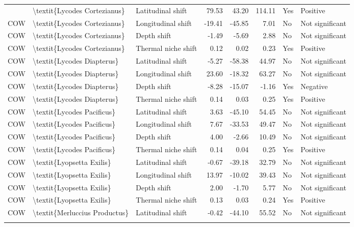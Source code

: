\begin{longtable}[t]{lllrrrll}
{{COW & \textbackslash{}textit\{Lycodes Cortezianus\} & Latitudinal shift & 79.53 & 43.20 & 114.11 & Yes & Positive\\
COW & \textbackslash{}textit\{Lycodes Cortezianus\} & Longitudinal shift & -19.41 & -45.85 & 7.01 & No & Not significant\\
\addlinespace
COW & \textbackslash{}textit\{Lycodes Cortezianus\} & Depth shift & -1.49 & -5.69 & 2.88 & No & Not significant\\
COW & \textbackslash{}textit\{Lycodes Cortezianus\} & Thermal niche shift & 0.12 & 0.02 & 0.23 & Yes & Positive\\
COW & \textbackslash{}textit\{Lycodes Diapterus\} & Latitudinal shift & -5.27 & -58.38 & 44.97 & No & Not significant\\
COW & \textbackslash{}textit\{Lycodes Diapterus\} & Longitudinal shift & 23.60 & -18.32 & 63.27 & No & Not significant\\
COW & \textbackslash{}textit\{Lycodes Diapterus\} & Depth shift & -8.28 & -15.07 & -1.16 & Yes & Negative\\
\addlinespace
COW & \textbackslash{}textit\{Lycodes Diapterus\} & Thermal niche shift & 0.14 & 0.03 & 0.25 & Yes & Positive\\
COW & \textbackslash{}textit\{Lycodes Pacificus\} & Latitudinal shift & 3.63 & -45.10 & 54.45 & No & Not significant\\
COW & \textbackslash{}textit\{Lycodes Pacificus\} & Longitudinal shift & 7.67 & -33.53 & 49.47 & No & Not significant\\
COW & \textbackslash{}textit\{Lycodes Pacificus\} & Depth shift & 4.00 & -2.66 & 10.49 & No & Not significant\\
COW & \textbackslash{}textit\{Lycodes Pacificus\} & Thermal niche shift & 0.14 & 0.04 & 0.25 & Yes & Positive\\
\addlinespace
COW & \textbackslash{}textit\{Lyopsetta Exilis\} & Latitudinal shift & -0.67 & -39.18 & 32.79 & No & Not significant\\
COW & \textbackslash{}textit\{Lyopsetta Exilis\} & Longitudinal shift & 13.97 & -10.02 & 39.43 & No & Not significant\\
COW & \textbackslash{}textit\{Lyopsetta Exilis\} & Depth shift & 2.00 & -1.70 & 5.77 & No & Not significant\\
COW & \textbackslash{}textit\{Lyopsetta Exilis\} & Thermal niche shift & 0.13 & 0.03 & 0.24 & Yes & Positive\\
COW & \textbackslash{}textit\{Merluccius Productus\} & Latitudinal shift & -0.42 & -44.10 & 55.52 & No & Not significant\\
}}
\end{longtable}
